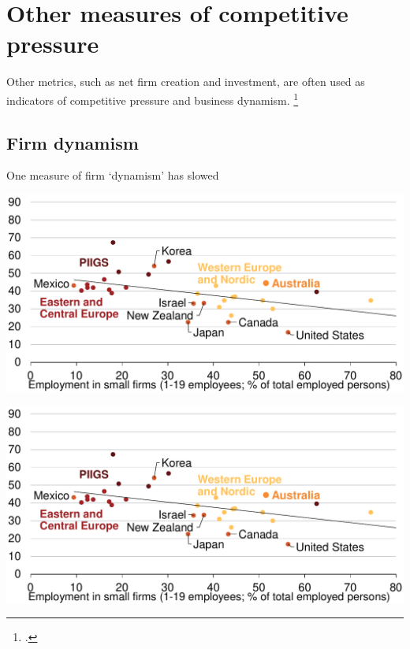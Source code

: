 \section{Other measures of competitive pressure}

Other metrics, such as net firm creation and investment, are often used as indicators of competitive pressure and business dynamism.%
\footcites{CEAcompetitionbriefmay2016}{Leigh-triggs-AER}

\subsection{Firm dynamism}

\begin{figureTop}
    \caption{One measure of firm ‘dynamism’ has slowed\label{fig:dynamism}}
     \vspace{3pt} 
    \includegraphics[page=3]{atlas/ChartsLucy_stunted}\vspace{5pt}
    
    \includegraphics[page=4]{atlas/ChartsLucy_stunted} 
\end{figureTop}

